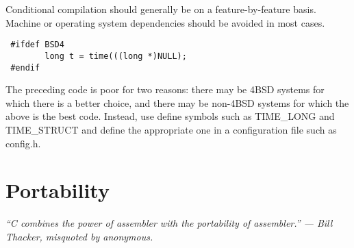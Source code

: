  Conditional compilation should generally be on a feature-by-feature basis.
Machine or operating system dependencies should be avoided in most cases. 
\begin{verbatim}
 #ifdef BSD4
        long t = time(((long *)NULL);
 #endif 
\end{verbatim}
The preceding code is poor for two reasons: there may be 4BSD systems for which
there is a better choice, and there may be non-4BSD systems for which the above
is the best code. Instead, use define symbols such as TIME\_LONG and
TIME\_STRUCT and define the appropriate one in a configuration file such as
config.h. 
\newpage
\section{Portability}

{\em ``C combines the power of assembler with the portability of assembler.''
 --- Bill Thacker, misquoted by anonymous.}

